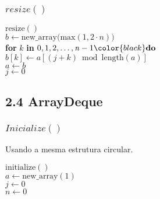 \documentclass{beamer}
\begin{document}
\begin{frame}
\frametitle{$resize()$}
\begin{oframed}
\begin{flushleft}
\hspace*{1em} $\ensuremath{\mathrm{resize}()}$\\
\hspace*{1em} \hspace*{1em} $\ensuremath{\ensuremath{\mathit{b}} \gets  \ensuremath{\mathrm{new\_array}(\mathrm{max}(1, 2\cdot \ensuremath{\mathit{n}})})}$\\
\hspace*{1em} \hspace*{1em} {\color{black} \textbf{for}} $\ensuremath{k}$ {\color{black} \textbf{in}} $\ensuremath{0,1,2,\ldots,\ensuremath{\mathit{n}}-1} {\color{black} \textbf{do}}$ \\
\hspace*{1em} \hspace*{1em} \hspace*{1em} $\ensuremath{\ensuremath{\mathit{b}}[\ensuremath{k}] \gets  \ensuremath{\ensuremath{\mathit{a}}[(\ensuremath{\mathit{j}}+\ensuremath{\mathit{k}}) \bmod  \mathrm{length}(\ensuremath{\mathit{a}})]}}$\\
\hspace*{1em} \hspace*{1em} $\ensuremath{\ensuremath{\mathit{a}} \gets  \ensuremath{b}}$\\
\hspace*{1em} \hspace*{1em} $\ensuremath{\ensuremath{\mathit{j}} \gets  \ensuremath{0}}$\\
\end{flushleft}
\end{oframed}
\end{frame}

\subsection{2.4 ArrayDeque}
\begin{frame}
\frametitle{$Inicialize()$}
Usando a mesma estrutura circular.
\begin{oframed}
\begin{flushleft}
\hspace*{1em} $\ensuremath{\mathrm{initialize}()}$\\
\hspace*{1em} \hspace*{1em} $\ensuremath{\ensuremath{\mathit{a}} \gets  \ensuremath{\mathrm{new\_array}(1)}}$\\
\hspace*{1em} \hspace*{1em} $\ensuremath{\ensuremath{\mathit{j}} \gets  \ensuremath{0}}$\\
\hspace*{1em} \hspace*{1em} $\ensuremath{\ensuremath{\mathit{n}} \gets  \ensuremath{0}}$\\
\end{flushleft}
\end{oframed}
\end{frame}
\end{document}
